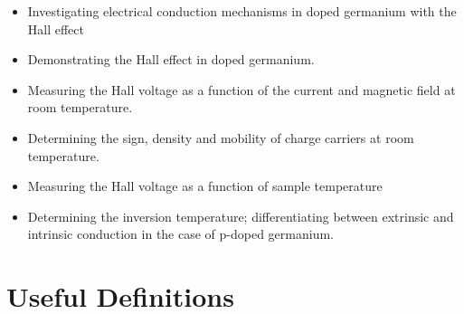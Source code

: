 \documentclass{../lab}
\begin{document}
\begin{itemize}
    \item Investigating electrical conduction mechanisms in doped germanium with the Hall effect
    \item Demonstrating the Hall effect in doped germanium.
    \item Measuring the Hall voltage as a function of the current and magnetic field at room temperature.
    \item Determining the sign, density and mobility of charge carriers at room temperature.
    \item Measuring the Hall voltage as a function of sample temperature
    \item Determining the inversion temperature; differentiating between extrinsic and intrinsic conduction in the case of p-doped germanium.
\end{itemize}

\section{Useful Definitions}
\end{document}
